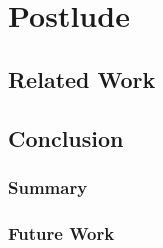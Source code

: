 \documentclass[12pt]{report}
\theoremstyle{definition}
\theoremstyle{remark}
\numberwithin{definition}{section}
\numberwithin{equation}{section}
\numberwithin{proposition}{section}
\numberwithin{conjecture}{section}
\numberwithin{theorem}{section}
\numberwithin{lemma}{section}
\numberwithin{corollary}{section}
\numberwithin{example}{section}
\numberwithin{remark}{section}
\begin{document}
\part{Postlude}\label{part:postlude}

\chapter{Related Work}\label{ch:related}
\chapter{Conclusion}\label{ch:conclusion}
\section{Summary}\label{sec:future}
\section{Future Work}\label{sec:future}


\end{document}
